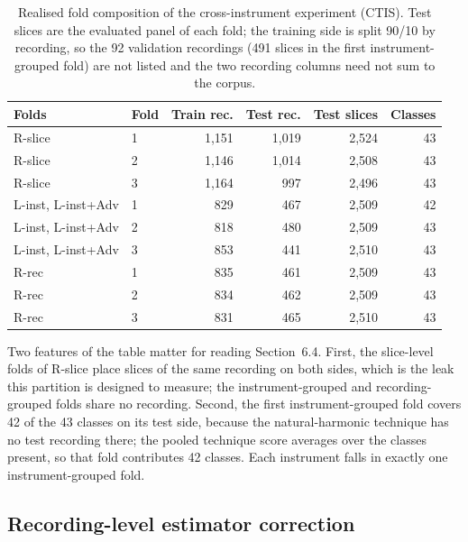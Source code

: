 \begin{table}[ht]\centering\small\caption{Realised fold composition of the cross-instrument experiment (CTIS). Test slices are the evaluated panel of each fold; the training side is split 90/10 by recording, so the 92 validation recordings (491 slices in the first instrument-grouped fold) are not listed and the two recording columns need not sum to the corpus.}
\label{tab:fold-composition}
\begin{tabular}{llrrrr}\toprule Folds & Fold & Train rec. & Test rec. & Test slices & Classes \\ \midrule
R-slice & 1 & 1{,}151 & 1{,}019 & 2{,}524 & 43 \\
R-slice & 2 & 1{,}146 & 1{,}014 & 2{,}508 & 43 \\
R-slice & 3 & 1{,}164 & 997 & 2{,}496 & 43 \\
L-inst, L-inst+Adv & 1 & 829 & 467 & 2{,}509 & 42 \\
L-inst, L-inst+Adv & 2 & 818 & 480 & 2{,}509 & 43 \\
L-inst, L-inst+Adv & 3 & 853 & 441 & 2{,}510 & 43 \\
R-rec & 1 & 835 & 461 & 2{,}509 & 43 \\
R-rec & 2 & 834 & 462 & 2{,}509 & 43 \\
R-rec & 3 & 831 & 465 & 2{,}510 & 43 \\
\bottomrule\end{tabular}\end{table}

Two features of the table matter for reading Section~6.4. First, the slice-level folds of R-slice
place slices of the same recording on both sides, which is the leak this partition is designed to
measure;
the instrument-grouped and recording-grouped folds share no recording. Second, the first
instrument-grouped fold covers 42 of
the 43 classes on its test side, because the natural-harmonic technique has no test recording there;
the pooled technique score averages over the classes present, so that fold contributes 42 classes.
Each instrument falls in exactly one instrument-grouped fold.

\subsection{Recording-level estimator correction}

